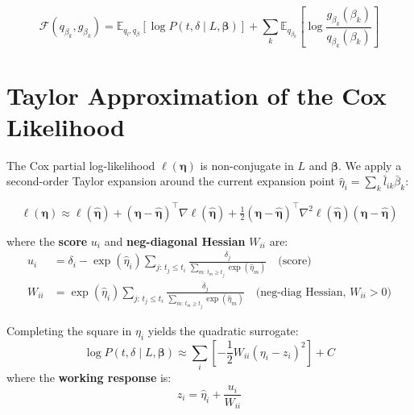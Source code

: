 \documentclass[11pt]{article}
\begin{document}
\begin{equation}
  \boxed{
  \mathcal{F}(q_{\beta_k}, g_{\beta_k}) =
  \mathbb{E}_{q_l, q_\beta}\!\left[\log P(t, \delta \mid L, \bm{\beta})\right]
  + \sum_k \mathbb{E}_{q_{\beta_k}}\!\left[\log\frac{g_{\beta_k}(\beta_k)}{q_{\beta_k}(\beta_k)}\right]
  }
  \label{eq:objective-beta}
\end{equation}

\section{Taylor Approximation of the Cox Likelihood}\label{sec:taylor}

The Cox partial log-likelihood $\ell(\bm{\eta})$ is non-conjugate in $L$ and
$\bm{\beta}$.  We apply a second-order Taylor expansion around the current
expansion point $\hat{\eta}_i = \sum_k \bar{l}_{ik}\bar{\beta}_k$:

\begin{equation}
  \ell(\bm{\eta}) \approx \ell(\hat{\bm{\eta}})
  + (\bm{\eta} - \hat{\bm{\eta}})^\top \nabla\ell(\hat{\bm{\eta}})
  + \tfrac{1}{2}(\bm{\eta} - \hat{\bm{\eta}})^\top \nabla^2\ell(\hat{\bm{\eta}}) (\bm{\eta} - \hat{\bm{\eta}})
\end{equation}

where the \textbf{score} $u_i$ and \textbf{neg-diagonal Hessian} $W_{ii}$ are:
\begin{align}
  u_i &= \delta_i - \exp(\hat{\eta}_i) \sum_{j:\,t_j \le t_i}
          \frac{\delta_j}{\sum_{m:\,t_m \ge t_j}\exp(\hat{\eta}_m)}
  \quad\text{(score)} \label{eq:score} \\
  W_{ii} &= \exp(\hat{\eta}_i) \sum_{j:\,t_j \le t_i}
             \frac{\delta_j}{\sum_{m:\,t_m \ge t_j}\exp(\hat{\eta}_m)}
  \quad\text{(neg-diag Hessian, }W_{ii}>0\text{)} \label{eq:hessian}
\end{align}

Completing the square in $\eta_i$ yields the quadratic surrogate:
\begin{equation}
  \log P(t, \delta \mid L, \bm{\beta}) \approx
  \sum_i \left[-\frac{1}{2} W_{ii}\left(\eta_i - z_i\right)^2\right] + C
  \label{eq:taylor-result}
\end{equation}
where the \textbf{working response} is:
\begin{equation}
  z_i = \hat{\eta}_i + \frac{u_i}{W_{ii}}
  \label{eq:working-response}
\end{equation}
\end{document}
